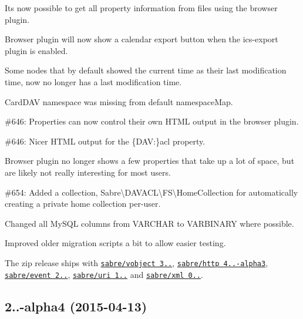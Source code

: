 \begin{DoxyItemize}
\item It\textquotesingle{}s now possible to get all property information from files using the browser plugin.
\item Browser plugin will now show a \textquotesingle{}calendar export\textquotesingle{} button when the ics-\/export plugin is enabled.
\item Some nodes that by default showed the current time as their last modification time, now no longer has a last modification time.
\item Card\+D\+AV namespace was missing from default namespace\+Map.
\item \#646\+: Properties can now control their own H\+T\+ML output in the browser plugin.
\item \#646\+: Nicer H\+T\+ML output for the {\ttfamily \{D\+AV\+:\}acl} property.
\item Browser plugin no longer shows a few properties that take up a lot of space, but are likely not really interesting for most users.
\item \#654\+: Added a collection, {\ttfamily Sabre\textbackslash{}D\+A\+V\+A\+CL\textbackslash{}FS\textbackslash{}Home\+Collection} for automatically creating a private home collection per-\/user.
\item Changed all My\+S\+QL columns from {\ttfamily V\+A\+R\+C\+H\+AR} to {\ttfamily V\+A\+R\+B\+I\+N\+A\+RY} where possible.
\item Improved older migration scripts a bit to allow easier testing.
\item The zip release ships with \href{http://sabre.io/vobject/}{\tt sabre/vobject 3..}, \href{http://sabre.io/http/}{\tt sabre/http 4..-\/alpha3}, \href{http://sabre.io/event/}{\tt sabre/event 2..}, \href{http://sabre.io/uri/}{\tt sabre/uri 1..} and \href{http://sabre.io/xml/}{\tt sabre/xml 0..}.
\end{DoxyItemize}

\subsection*{2..-\/alpha4 (2015-\/04-\/13) }


